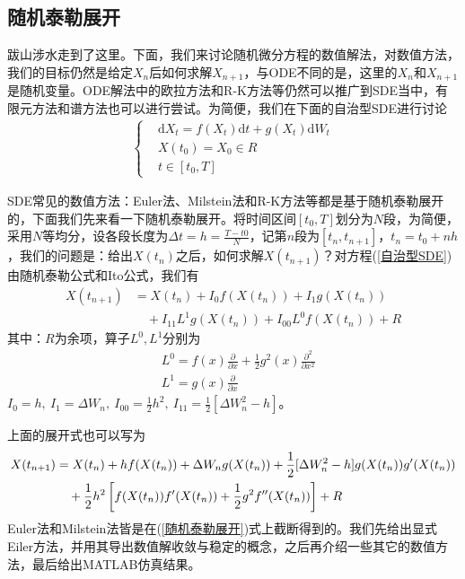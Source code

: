     \subsection{随机泰勒展开}
        \label{subsec:随机泰勒展开}
        \par
        跋山涉水走到了这里。下面，我们来讨论随机微分方程的数值解法，对数值方法，我们的目标仍然是给定$X_n$后如何求解$X_{n+1}$，与ODE不同的是，这里的$X_n$和$X_{n+1}$是随机变量。ODE解法中的欧拉方法和R-K方法等仍然可以推广到SDE当中，有限元方法和谱方法也可以进行尝试。为简便，我们在下面的自治型SDE进行讨论
        \begin{align}
            \label{自治型SDE}
            \left\{
            \begin{aligned}
                &\mathrm{d}X_t = f(X_t)\mathrm{d}t + g(X_t)\mathrm{d}W_t\\
                &X(t_0) = X_0 \in R\\
                &t\in [t_0,T]
            \end{aligned}
            \right.
        \end{align}
        \par
        SDE常见的数值方法：Euler法、Milstein法和R-K方法等都是基于随机泰勒展开的，下面我们先来看一下随机泰勒展开。将时间区间$[t_0,T]$划分为$N$段，为简便，采用$N$等均分，设各段长度为$\Delta t = h=\frac{T-t0}{N}$，记第$n$段为$[t_n,t_{n+1}]$，$t_n = t_0+nh$，我们的问题是：给出$X(t_n)$之后，如何求解$X(t_{n+1})$？对方程(\ref{自治型SDE})由随机泰勒公式和Ito公式，我们有
        \begin{align*}
            X(t_{n+1}) &= X(t_n) + I_0f(X(t_n)) + I_1g(X(t_n)) \\
            &\quad + I_{11}L^1g(X(t_n))+ I_{00}L^0 f(X(t_n)) + R
        \end{align*}
        其中：$R$为余项，算子$L^0,L^1$分别为
        \begin{align*}
            &L^0 = f(x)\frac{\partial}{\partial x} + \frac 12 g^2(x) \frac{\partial ^2}{\partial x^2}\\
            &L^1 = g(x) \frac{\partial}{\partial x}
        \end{align*}
        $I_0 = h,\ I_1 = \Delta W_n,\ I_{00} = \frac 12 h^2,\ I_{11} = \frac{1}{2}[\Delta W_n^2 - h]$。
        \par
        上面的展开式也可以写为
        \begin{align}
            \label{随机泰勒展开}
            X(t_{n+1}) &= X(t_n) + hf(X(t_n))+\Delta W_ng(X(t_n))
             +\frac 12 [\Delta W_n^2 - h]g(X(t_n))g'(X(t_n))
            \notag\\
            &\quad + \frac 12 h^2 \left[ f(X(t_n)) f'(X(t_n)) + \frac 12 g^2f''(X(t_n)) \right] +R
        \end{align}
        Euler法和Milstein法皆是在(\ref{随机泰勒展开})式上截断得到的。我们先给出显式Eiler方法，并用其导出数值解收敛与稳定的概念，之后再介绍一些其它的数值方法，最后给出MATLAB仿真结果。
